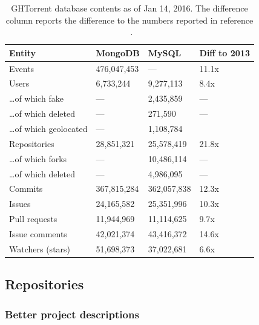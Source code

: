 \documentclass{sig-alternate}
\begin{document}
\begin{table}
  \centering
  \begin{small}
  \label{tab:datasetsize}
  \begin{tabular}{llll}
    \hline
    \bfseries{Entity} & \bfseries{MongoDB} & \bfseries{MySQL} & \bfseries{Diff to 2013} \\
    \hline
      Events                     & 476,047,453 & ---           & 11.1x\\
      Users                      & 6,733,244   & 9,277,113     & 8.4x \\
      \ldots of which fake       & ---         & 2,435,859     & ---\\
      \ldots of which deleted    & ---         & 271,590       & ---\\
      \ldots of which geolocated & ---         & 1,108,784     & \\
      Repositories               & 28,851,321  & 25,578,419    & 21.8x\\
      \ldots of which forks      & ---         & 10,486,114    & --- \\
      \ldots of which deleted    & ---         & 4,986,095     & ---\\
      Commits                    & 367,815,284 & 362,057,838   & 12.3x \\
      Issues                     & 24,165,582  & 25,351,996    & 10.3x \\
      Pull requests              & 11,944,969  & 11,114,625    & 9.7x \\
      Issue comments             & 42,021,374  & 43,416,372    & 14.6x\\
      Watchers (stars)           & 51,698,373  & 37,022,681    & 6.6x\\
      \hline
  \end{tabular}
    \caption{GHTorrent database contents as of Jan 14, 2016. The difference column reports the difference to the numbers reported in reference ~\cite{Gousi13}.}
  \end{small}
\end{table}

\subsection{Repositories}

\subsubsection{Better project descriptions}
\end{document}
